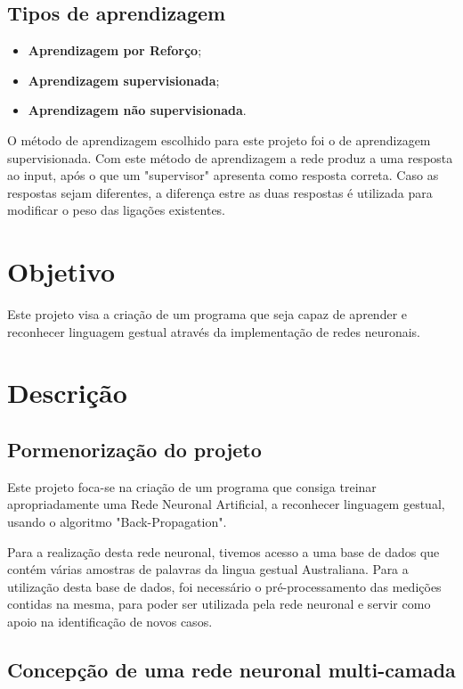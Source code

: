 \documentclass[10pt,a4paper]{article}
\begin{document}
 \subsection{Tipos de aprendizagem}
 \begin{itemize}
 \item \textbf{Aprendizagem por Reforço};
 \item \textbf{Aprendizagem supervisionada};
 \item \textbf{Aprendizagem não supervisionada}.
 \end{itemize}
 
 O método de aprendizagem escolhido para este projeto foi o de aprendizagem supervisionada. Com este método de aprendizagem a rede produz a uma resposta ao input, após o que um "supervisor" apresenta como resposta correta. Caso as respostas sejam diferentes, a diferença estre as duas respostas é utilizada para modificar o peso das ligações existentes.

\newpage

\section{Objetivo}
\subitem

Este projeto visa a criação de um programa que seja capaz de aprender e reconhecer linguagem gestual através da implementação de redes neuronais.

\section{Descrição}

\subsection{Pormenorização do projeto}
\subitem

Este projeto foca-se na criação de um programa que consiga treinar apropriadamente uma Rede Neuronal Artificial, a reconhecer linguagem gestual, usando o algoritmo "Back-Propagation". 

Para a realização desta rede neuronal, tivemos acesso a uma base de dados que contém várias amostras de palavras da lingua gestual Australiana. Para a utilização desta base de dados, foi necessário o pré-processamento das medições contidas na mesma, para poder ser utilizada pela rede neuronal e servir como apoio na identificação de novos casos.

\subsection{Concepção de uma rede neuronal multi-camada}
\subitem
\end{document}
